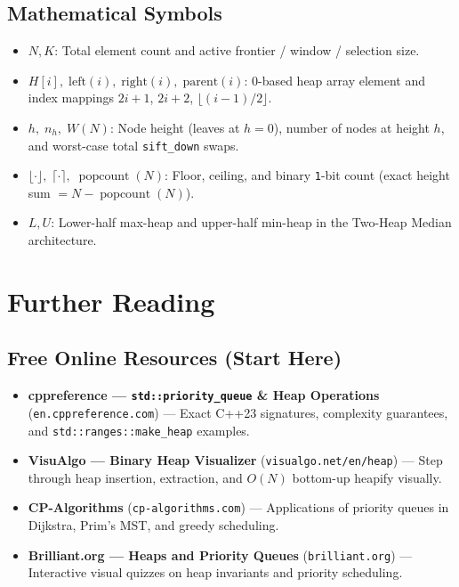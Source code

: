 \documentclass[11pt,a4paper]{article}
\theoremstyle{definition}
\begin{document}
\subsection*{Mathematical Symbols}
\begin{itemize}[itemsep=2pt]
    \item $N, K$: Total element count and active frontier / window / selection size.
    \item $H[i],\; \text{left}(i),\; \text{right}(i),\; \text{parent}(i)$: 0-based heap array element and index mappings $2i+1$, $2i+2$, $\lfloor (i-1)/2 \rfloor$.
    \item $h,\; n_h,\; W(N)$: Node height (leaves at $h = 0$), number of nodes at height $h$, and worst-case total \texttt{sift\_down} swaps.
    \item $\lfloor \cdot \rfloor,\; \lceil \cdot \rceil,\; \operatorname{popcount}(N)$: Floor, ceiling, and binary \texttt{1}-bit count (exact height sum $= N - \operatorname{popcount}(N)$).
    \item $L, U$: Lower-half max-heap and upper-half min-heap in the Two-Heap Median architecture.
\end{itemize}

\section{Further Reading}

\subsection*{Free Online Resources (Start Here)}
\begin{itemize}
    \item \textbf{cppreference --- \texttt{std::priority\_queue} \& Heap Operations} (\texttt{en.cppreference.com}) --- Exact C++23 signatures, complexity guarantees, and \texttt{std::ranges::make\_heap} examples.
    \item \textbf{VisuAlgo --- Binary Heap Visualizer} (\texttt{visualgo.net/en/heap}) --- Step through heap insertion, extraction, and $O(N)$ bottom-up heapify visually.
    \item \textbf{CP-Algorithms} (\texttt{cp-algorithms.com}) --- Applications of priority queues in Dijkstra, Prim's MST, and greedy scheduling.
    \item \textbf{Brilliant.org --- Heaps and Priority Queues} (\texttt{brilliant.org}) --- Interactive visual quizzes on heap invariants and priority scheduling.
\end{itemize}
\end{document}
